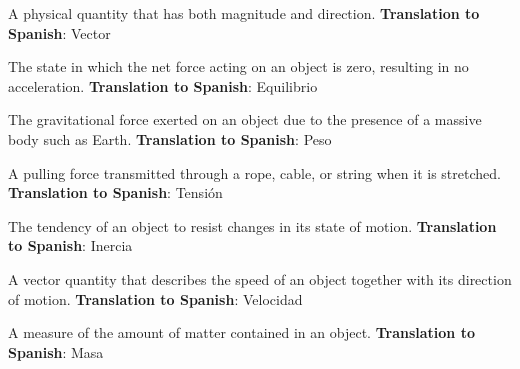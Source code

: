 \begin{vocabulary}[Vector]
A physical quantity that has both magnitude and direction. \newline
\textbf{Translation to Spanish}: Vector \newline
\end{vocabulary}

\begin{vocabulary}[Equilibrium]
The state in which the net force acting on an object is zero, resulting in no acceleration. \newline
\textbf{Translation to Spanish}: Equilibrio \newline
\end{vocabulary}

\begin{vocabulary}[Weight]
The gravitational force exerted on an object due to the presence of a massive body such as Earth. \newline
\textbf{Translation to Spanish}: Peso \newline
\end{vocabulary}

\begin{vocabulary}[Tension]
A pulling force transmitted through a rope, cable, or string when it is stretched. \newline
\textbf{Translation to Spanish}: Tensión \newline
\end{vocabulary}

\begin{vocabulary}[Inertia]
The tendency of an object to resist changes in its state of motion. \newline
\textbf{Translation to Spanish}: Inercia \newline
\end{vocabulary}

\begin{vocabulary}[Velocity]
A vector quantity that describes the speed of an object together with its direction of motion. \newline
\textbf{Translation to Spanish}: Velocidad \newline
\end{vocabulary}

\begin{vocabulary}[Mass]
A measure of the amount of matter contained in an object. \newline
\textbf{Translation to Spanish}: Masa \newline
\end{vocabulary}

